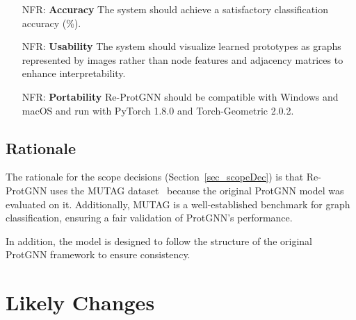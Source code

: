 \documentclass[12pt]{article}
\newcounter{nfrnum} %
\begin{document}
\noindent \begin{itemize}

\item[NFR\refstepcounter{nfrnum}\thenfrnum \label{NFR_Accuracy}:]
  \textbf{Accuracy} The system should achieve a satisfactory classification accuracy (\%).

\item[NFR\refstepcounter{nfrnum}\thenfrnum \label{NFR_Usability}:] \textbf{Usability}
  The system should visualize learned prototypes as graphs represented by images rather than node features and adjacency matrices to enhance interpretability.


\item[NFR\refstepcounter{nfrnum}\thenfrnum \label{NFR_Portability}:]
  \textbf{Portability} Re-ProtGNN should be compatible with Windows and macOS and run with PyTorch 1.8.0 and Torch-Geometric 2.0.2.
  

\end{itemize}


\subsection{Rationale}

The rationale for the scope decisions (Section~\ref{sec_scopeDec}) is that Re-ProtGNN uses the MUTAG dataset~\cite{debnath1991structure} because the original ProtGNN model was evaluated on it. Additionally, MUTAG is a well-established benchmark for graph classification, ensuring a fair validation of ProtGNN's performance.

In addition, the model is designed to follow the structure of the original ProtGNN framework to ensure consistency.


\section{Likely Changes}    
\end{document}
